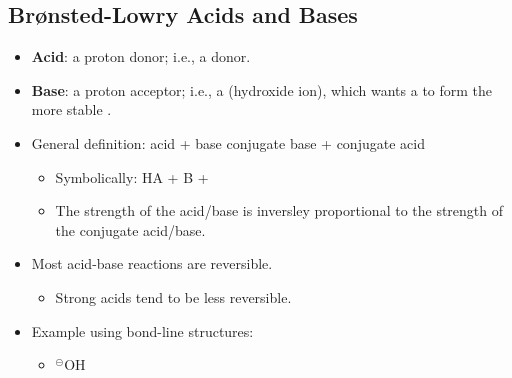 \documentclass[12pt,a4paper]{article}
\begin{document}
\subsection{Br{\o}nsted-Lowry Acids and Bases}
\begin{itemize}
    \item \textbf{Acid}: a {\color{o-Sun}proton donor}; i.e., a {\color{pos}} donor.
    \item \textbf{Base}: a {\color{o-Sun}proton acceptor}; i.e., a {\color{neg}} (hydroxide ion), which wants a {\color{pos}} to form the more stable .
    \item General definition: {\color{pos}acid} + {\color{neg}base} \ch{<>} {\color{neg}conjugate base} + {\color{pos}conjugate acid}
        \begin{itemize}
            \item Symbolically: {\color{pos}HA} + {\color{neg}B} \ch{<>} {\color{neg}} + {\color{pos}}
            \item The strength of the acid/base is {\color{o-Sun}inversley proportional} to the strength of the conjugate acid/base.
        \end{itemize}
    \item Most acid-base reactions are reversible.
        \begin{itemize}
            \item Strong acids tend to be less reversible.
        \end{itemize}
    \item Example using bond-line structures:
        \begin{itemize}
            \item 
            \hspace{6pt}{\large+}\hspace{6pt}
            \hspace{6pt}{\large\ch{<>}}\hspace{6pt}
            {\color{neg}$^\circleddash$O}H
            \hspace{6pt}{\large+}\hspace{6pt}
    \end{itemize}

\end{itemize}
\end{document}
